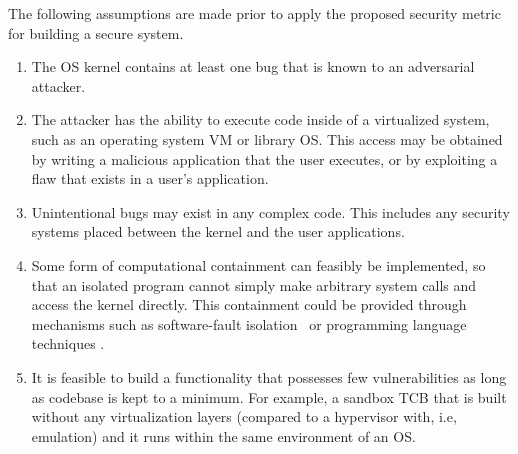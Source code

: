 The following assumptions are made prior to apply the proposed security metric for building %
a secure system.

\begin{enumerate}
\item The OS kernel contains at least one bug that is known to an adversarial attacker.

\item The attacker has the ability to execute code inside
of a virtualized system, such as an operating system VM or library OS.
This access may be obtained by writing a malicious application
that the user executes, or by exploiting a flaw that exists in a user's
application.

\item Unintentional bugs may exist in any complex code. This
includes any security systems placed between the kernel and the user
applications.

\item Some form of computational containment can feasibly be implemented, so that an isolated program cannot simply
make arbitrary system calls and access the kernel directly. This containment could
be provided through mechanisms such as software-fault isolation~\cite{SFI:93} or programming
language techniques \cite{JS-Sandboxing1, JVM}. %

\item It is feasible to build a functionality that possesses few vulnerabilities as long as codebase is kept to a minimum. 
For example, a sandbox TCB that is built without any virtualization layers (compared to a hypervisor with, i.e, emulation) 
and it runs within the same environment of an OS.

\end{enumerate}